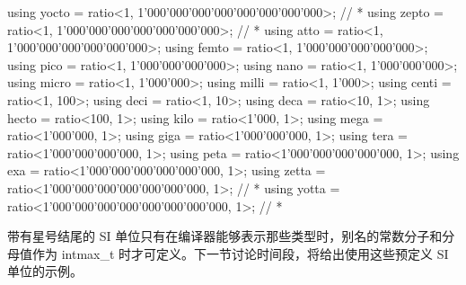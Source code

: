 \begin{cpp}
using yocto = ratio<1, 1'000'000'000'000'000'000'000'000>; // *
using zepto = ratio<1, 1'000'000'000'000'000'000'000>; // *
using atto = ratio<1, 1'000'000'000'000'000'000>;
using femto = ratio<1, 1'000'000'000'000'000>;
using pico = ratio<1, 1'000'000'000'000>;
using nano = ratio<1, 1'000'000'000>;
using micro = ratio<1, 1'000'000>;
using milli = ratio<1, 1'000>;
using centi = ratio<1, 100>;
using deci = ratio<1, 10>;
using deca = ratio<10, 1>;
using hecto = ratio<100, 1>;
using kilo = ratio<1'000, 1>;
using mega = ratio<1'000'000, 1>;
using giga = ratio<1'000'000'000, 1>;
using tera = ratio<1'000'000'000'000, 1>;
using peta = ratio<1'000'000'000'000'000, 1>;
using exa = ratio<1'000'000'000'000'000'000, 1>;
using zetta = ratio<1'000'000'000'000'000'000'000, 1>; // *
using yotta = ratio<1'000'000'000'000'000'000'000'000, 1>; // *
\end{cpp}

带有星号结尾的 SI 单位只有在编译器能够表示那些类型时，别名的常数分子和分母值作为 intmax\_t 时才可定义。下一节讨论时间段，将给出使用这些预定义 SI 单位的示例。




